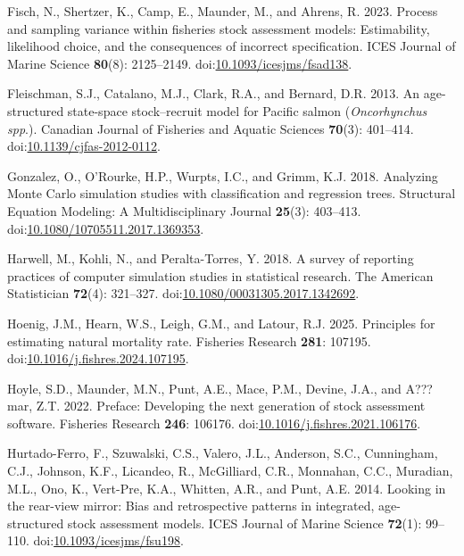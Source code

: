 \documentclass[
  12pt,
]{article}
\newlength{\cslhangindent}
\newenvironment{CSLReferences}[2] %
 {\begin{list}{}{%
  \setlength{\itemindent}{0pt} %
  \setlength{\leftmargin}{0pt} %
  \setlength{\parsep}{0pt} %
  \ifodd #1
   \setlength{\leftmargin}{\cslhangindent} %
   \setlength{\itemindent}{-1\cslhangindent} %
  \fi
  \setlength{\itemsep}{#2\baselineskip}}} %
 {\end{list}} %
\begin{document}
\begin{CSLReferences}{1}{0}
Fisch, N., Shertzer, K., Camp, E., Maunder, M., and Ahrens, R. 2023.
Process and sampling variance within fisheries stock assessment models:
Estimability, likelihood choice, and the consequences of incorrect
specification. ICES Journal of Marine Science \textbf{80}(8):
2125--2149.
doi:\href{https://doi.org/10.1093/icesjms/fsad138}{10.1093/icesjms/fsad138}.

Fleischman, S.J., Catalano, M.J., Clark, R.A., and Bernard, D.R. 2013.
An age-structured state-space stock--recruit model for {P}acific salmon
(\emph{{O}ncorhynchus spp}.). Canadian Journal of Fisheries and Aquatic
Sciences \textbf{70}(3): 401--414.
doi:\href{https://doi.org/10.1139/cjfas-2012-0112}{10.1139/cjfas-2012-0112}.

Gonzalez, O., O'Rourke, H.P., Wurpts, I.C., and Grimm, K.J. 2018.
Analyzing {M}onte {C}arlo simulation studies with classification and
regression trees. Structural Equation Modeling: A Multidisciplinary
Journal \textbf{25}(3): 403--413.
doi:\href{https://doi.org/10.1080/10705511.2017.1369353}{10.1080/10705511.2017.1369353}.

Harwell, M., Kohli, N., and Peralta-Torres, Y. 2018. A survey of
reporting practices of computer simulation studies in statistical
research. The American Statistician \textbf{72}(4): 321--327.
doi:\href{https://doi.org/10.1080/00031305.2017.1342692}{10.1080/00031305.2017.1342692}.

Hoenig, J.M., Hearn, W.S., Leigh, G.M., and Latour, R.J. 2025.
Principles for estimating natural mortality rate. Fisheries Research
\textbf{281}: 107195.
doi:\href{https://doi.org/10.1016/j.fishres.2024.107195}{10.1016/j.fishres.2024.107195}.

Hoyle, S.D., Maunder, M.N., Punt, A.E., Mace, P.M., Devine, J.A., and
A???mar, Z.T. 2022. Preface: Developing the next generation of stock
assessment software. Fisheries Research \textbf{246}: 106176.
doi:\href{https://doi.org/10.1016/j.fishres.2021.106176}{10.1016/j.fishres.2021.106176}.

Hurtado-Ferro, F., Szuwalski, C.S., Valero, J.L., Anderson, S.C.,
Cunningham, C.J., Johnson, K.F., Licandeo, R., McGilliard, C.R.,
Monnahan, C.C., Muradian, M.L., Ono, K., Vert-Pre, K.A., Whitten, A.R.,
and Punt, A.E. 2014. Looking in the rear-view mirror: Bias and
retrospective patterns in integrated, age-structured stock assessment
models. ICES Journal of Marine Science \textbf{72}(1): 99--110.
doi:\href{https://doi.org/10.1093/icesjms/fsu198}{10.1093/icesjms/fsu198}.


\end{CSLReferences}
\end{document}

